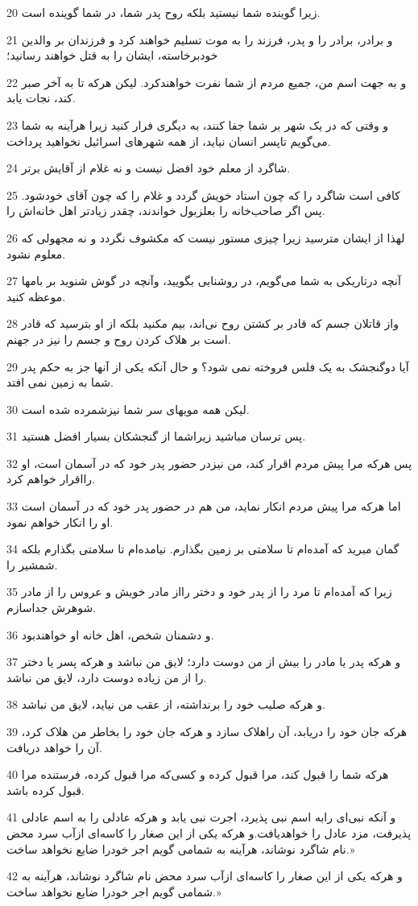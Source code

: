 \par 20 زیرا گوینده شما نیستید بلکه روح پدر شما، در شما گوینده است.
\par 21 و برادر، برادر را و پدر، فرزند را به موت تسلیم خواهند کرد و فرزندان بر والدین خودبرخاسته، ایشان را به قتل خواهند رسانید؛
\par 22 و به جهت اسم من، جمیع مردم از شما نفرت خواهندکرد. لیکن هر‌که تا به آخر صبر کند، نجات یابد.
\par 23 و وقتی که در یک شهر بر شما جفا کنند، به دیگری فرار کنید زیرا هرآینه به شما می‌گویم تاپسر انسان نیاید، از همه شهرهای اسرائیل نخواهید پرداخت.
\par 24 شاگرد از معلم خود افضل نیست و نه غلام از آقایش برتر.
\par 25 کافی است شاگرد را که چون استاد خویش گردد و غلام را که چون آقای خودشود. پس اگر صاحب‌خانه را بعلزبول خواندند، چقدر زیادتر اهل خانه‌اش را.
\par 26 لهذا از ایشان مترسید زیرا چیزی مستور نیست که مکشوف نگردد و نه مجهولی که معلوم نشود.
\par 27 آنچه درتاریکی به شما می‌گویم، در روشنایی بگویید، وآنچه در گوش شنوید بر بامها موعظه کنید.
\par 28 واز قاتلان جسم که قادر بر کشتن روح نی‌اند، بیم مکنید بلکه از او بترسید که قادر است بر هلاک کردن روح و جسم را نیز در جهنم.
\par 29 آیا دوگنجشک به یک فلس فروخته نمی شود؟ و حال آنکه یکی از آنها جز به حکم پدر شما به زمین نمی افتد.
\par 30 لیکن همه مویهای سر شما نیزشمرده شده است.
\par 31 پس ترسان مباشید زیراشما از گنجشکان بسیار افضل هستید.
\par 32 پس هر‌که مرا پیش مردم اقرار کند، من نیزدر حضور پدر خود که در آسمان است، او رااقرار خواهم کرد.
\par 33 اما هر‌که مرا پیش مردم انکار نماید، من هم در حضور پدر خود که در آسمان است او را انکار خواهم نمود.
\par 34 گمان مبرید که آمده‌ام تا سلامتی بر زمین بگذارم. نیامده‌ام تا سلامتی بگذارم بلکه شمشیر را.
\par 35 زیرا که آمده‌ام تا مرد را از پدر خود و دختر رااز مادر خویش و عروس را از مادر شوهرش جداسازم.
\par 36 و دشمنان شخص، اهل خانه او خواهندبود.
\par 37 و هر‌که پدر یا مادر را بیش از من دوست دارد؛ لایق من نباشد و هر‌که پسر یا دختر را از من زیاده دوست دارد، لایق من نباشد.
\par 38 و هر‌که صلیب خود را برنداشته، از عقب من نیاید، لایق من نباشد.
\par 39 هر‌که جان خود را دریابد، آن راهلاک سازد و هر‌که جان خود را بخاطر من هلاک کرد، آن را خواهد دریافت.
\par 40 هر‌که شما را قبول کند، مرا قبول کرده و کسی‌که مرا قبول کرده، فرستنده مرا قبول کرده باشد.
\par 41 و آنکه نبی‌ای رابه اسم نبی پذیرد، اجرت نبی یابد و هر‌که عادلی را به اسم عادلی پذیرفت، مزد عادل را خواهدیافت.و هر‌که یکی از این صغار را کاسه‌ای ازآب سرد محض نام شاگرد نوشاند، هرآینه به شمامی گویم اجر خودرا ضایع نخواهد ساخت.»
\par 42 و هر‌که یکی از این صغار را کاسه‌ای ازآب سرد محض نام شاگرد نوشاند، هرآینه به شمامی گویم اجر خودرا ضایع نخواهد ساخت.»

